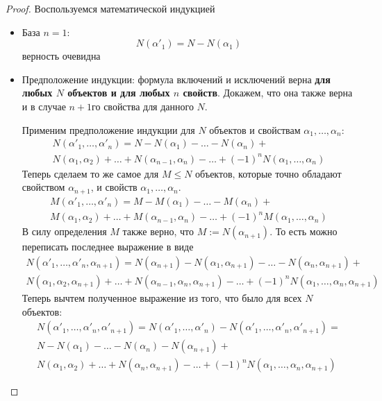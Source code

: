 \begin{proof}
	Воспользуемся математической индукцией
	\begin{itemize}
		\item База $n = 1$:
		\[
			N(\alpha'_1) = N - N(\alpha_1)
		\]
		верность очевидна
		
		\item Предположение индукции: формула включений и исключений верна \textbf{для любых $N$ объектов и для любых $n$ свойств}. Докажем, что она также верна и в случае $n + 1$го свойства для данного $N$.
		
		Применим предположение индукции для $N$ объектов и свойствам $\alpha_1, \ldots, \alpha_n$:
		\begin{multline*}
			N(\alpha'_1, \ldots, \alpha'_n) = N - N(\alpha_1) - \ldots - N(\alpha_n) + \\
			N(\alpha_1, \alpha_2) + \ldots + N(\alpha_{n - 1}, \alpha_n) - \ldots + (-1)^n N(\alpha_1, \ldots, \alpha_n)
		\end{multline*}
		Теперь сделаем то же самое для $M \le N$ объектов, которые точно обладают свойством $\alpha_{n + 1}$, и свойств $\alpha_1, \ldots, \alpha_n$.
		\begin{multline*}
			M(\alpha'_1, \ldots, \alpha'_n) = M - M(\alpha_1) - \ldots - M(\alpha_n) + \\
			M(\alpha_1, \alpha_2) + \ldots + M(\alpha_{n - 1}, \alpha_n) - \ldots + (-1)^n M(\alpha_1, \ldots, \alpha_n)
		\end{multline*}
		В силу определения $M$ также верно, что $M := N(\alpha_{n + 1})$. То есть можно переписать последнее выражение в виде
		\begin{multline*}
			N(\alpha'_1, \ldots, \alpha'_n, \alpha_{n + 1}) = N(\alpha_{n + 1}) - N(\alpha_1, \alpha_{n + 1}) - \ldots - N(\alpha_n, \alpha_{n + 1}) + \\
			N(\alpha_1, \alpha_2, \alpha_{n + 1}) + \ldots + N(\alpha_{n - 1}, \alpha_n, \alpha_{n + 1}) - \ldots + (-1)^n N(\alpha_1, \ldots, \alpha_n, \alpha_{n + 1})
		\end{multline*}
		Теперь вычтем полученное выражение из того, что было для всех $N$ объектов:
		\begin{multline*}
			N(\alpha'_1, \ldots, \alpha'_n, \alpha'_{n + 1}) = N(\alpha'_1, \ldots, \alpha'_n) - N(\alpha'_1, \ldots, \alpha'_n, \alpha'_{n + 1}) = \\
			N - N(\alpha_1) - \ldots - N(\alpha_n) - N(\alpha_{n + 1}) + \\
			N(\alpha_1, \alpha_2) + \ldots + N(\alpha_n, \alpha_{n + 1}) - \ldots + (-1)^n N(\alpha_1, \ldots, \alpha_n, \alpha_{n + 1})
		\end{multline*}
	\end{itemize}
\end{proof}

